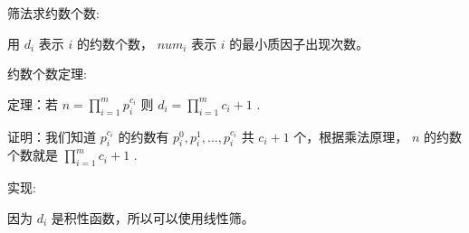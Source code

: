 筛法求约数个数:

用 $d_i$ 表示 $i$ 的约数个数， $num_i$ 表示 $i$ 的最小质因子出现次数。

约数个数定理:

定理：若 $n=\prod_{i=1}^mp_i^{c_i}$ 则 $d_i=\prod_{i=1}^mc_i+1$ .

证明：我们知道 $p_i^{c_i}$ 的约数有 $p_i^0,p_i^1,\dots ,p_i^{c_i}$ 共 $c_i+1$ 个，根据乘法原理， $n$ 的约数个数就是 $\prod_{i=1}^mc_i+1$ .

实现:

因为 $d_i$ 是积性函数，所以可以使用线性筛。
